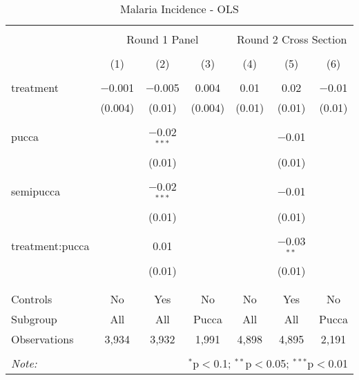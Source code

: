 
\begin{table}[!htbp] \centering 
  \caption{Malaria Incidence - OLS} 
  \label{tbl:Malaria Incidence - OLS} 
\begin{tabular}{@{\extracolsep{5pt}}lcccccc} 
\\[-1.8ex]\hline 
\hline \\[-1.8ex] 
 & \multicolumn{3}{c}{Round 1 Panel} & \multicolumn{3}{c}{Round 2 Cross Section} \\ 
\\[-1.8ex] & (1) & (2) & (3) & (4) & (5) & (6)\\ 
\hline \\[-1.8ex] 
 treatment & $-$0.001 & $-$0.005 & 0.004 & 0.01 & 0.02 & $-$0.01 \\ 
  & (0.004) & (0.01) & (0.004) & (0.01) & (0.01) & (0.01) \\ 
  & & & & & & \\ 
 pucca &  & $-$0.02$^{***}$ &  &  & $-$0.01 &  \\ 
  &  & (0.01) &  &  & (0.01) &  \\ 
  & & & & & & \\ 
 semipucca &  & $-$0.02$^{***}$ &  &  & $-$0.01 &  \\ 
  &  & (0.01) &  &  & (0.01) &  \\ 
  & & & & & & \\ 
 treatment:pucca &  & 0.01 &  &  & $-$0.03$^{**}$ &  \\ 
  &  & (0.01) &  &  & (0.01) &  \\ 
  & & & & & & \\ 
\hline \\[-1.8ex] 
Controls & No & Yes & No & No & Yes & No \\ 
Subgroup & All & All & Pucca & All & All & Pucca \\ 
Observations & 3,934 & 3,932 & 1,991 & 4,898 & 4,895 & 2,191 \\ 
\hline 
\hline \\[-1.8ex] 
\textit{Note:}  & \multicolumn{6}{r}{$^{*}$p$<$0.1; $^{**}$p$<$0.05; $^{***}$p$<$0.01} \\ 
\end{tabular} 
\end{table} 

